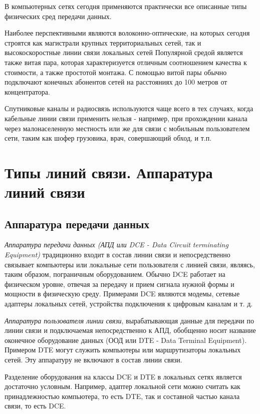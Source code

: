 В компьютерных сетях сегодня применяются практически все описанные типы физических сред передачи данных.

Наиболее перспективными являются волоконно-оптические, на которых сегодня строятся как магистрали крупных территориальных сетей, так и высокоскоростные линии связи локальных сетей
Популярной средой является также витая пара, которая характеризуется отличным соотношением качества к стоимости, а также простотой монтажа.
С помощью витой пары обычно подключают конечных абонентов сетей на расстояниях до 100 метров от концентратора.

Спутниковые каналы и радиосвязь используются чаще всего в тех случаях, когда кабельные линии связи применить нельзя - например, при прохождении канала через малонаселенную местность или же для связи с мобильным пользователем сети, таким как шофер грузовика, врач, совершающий обход, и т.п.

\section{Типы линий связи. Аппаратура линий связи}

\subsection{Аппаратура передачи данных}

\emph{Аппаратура передачи данных (АПД или DCE - Data Circuit terminating Equipment)} традиционно входит в состав линии связи и непосредственно связывает компьютеры или локальные сети пользователя с линией связи, являясь, таким образом, пограничным оборудованием.
Обычно DCE работает на физическом уровне, отвечая за передачу и прием сигнала нужной формы и мощности в физическую среду.
Примерами DCE являются модемы, сетевые адаптеры локальных сетей, устройства подключения к цифровым каналам и т.
д.

\emph{Аппаратура пользователя линии связи}, вырабатывающая данные для передачи по линии связи и подключаемая непосредственно к АПД, обобщенно носит название оконечное оборудование данных (ООД или DTE - Data Terminal Equipment).
Примером DTE могут служить компьютеры или маршрутизаторы  локальных сетей.
Эту аппаратуру не включают в состав линии связи.

Разделение оборудования на классы DCE и DTE в локальных сетях является достаточно условным.
Например, адаптер локальной сети можно считать как принадлежностью компьютера, то есть DTE, так и составной частью канала связи, то есть DCE.

